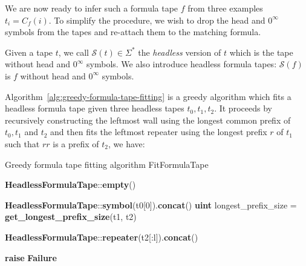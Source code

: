 We are now ready to infer such a formula tape $f$ from three examples $t_i=C_f(i)$.
To simplify the procedure, we wish to drop the head and $0^\infty$ symbols from the tapes and re-attach them to the matching formula.

Given a tape $t$, we call $\mathcal{S}(t) \in \Sigma^*$ the \textit{headless} version of $t$ which is the tape without head and $0^\infty$ symbols. We also introduce headless formula tapes: $\mathcal{S}(f)$ is $f$ without head and $0^\infty$ symbols.

Algorithm~\ref{alg:greedy-formula-tape-fitting} is a greedy algorithm which fits a headless formula tape given three headless tapes $t_0, t_1, t_2$. It proceeds by recursively constructing the leftmost wall using the longest common prefix of $t_0, t_1$ and $t_2$ and then fits the leftmost repeater using the longest prefix $r$ of $t_1$ such that $rr$ is a prefix of $t_2$, we have:

\begin{algorithm}
    \caption{Greedy formula tape fitting algorithm {\sc FitFormulaTape}}\label{alg:greedy-formula-tape-fitting}
    \begin{algorithmic}[1]


        \State \Return \textbf{HeadlessFormulaTape}::\textbf{empty}()

        \EndIf
        \State
        \State \Return \textbf{HeadlessFormulaTape}::\textbf{symbol}(t0[0]).\textbf{concat}()
        \EndIf
        \State
        \State
        \textbf{uint} longest\_prefix\_size = \textbf{get\_longest\_prefix\_size}(t1, t2)
        \State

        \State \Return \textbf{HeadlessFormulaTape}::\textbf{repeater}(t2[:l]).\textbf{concat}()
        \EndIf

        \EndFor
        \State
        \State \textbf{raise} \textbf{Failure}
        \EndProcedure
    \end{algorithmic}
\end{algorithm}


